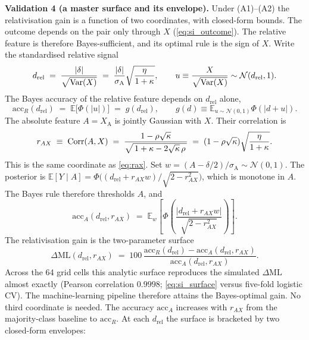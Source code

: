 \textbf{Validation 4 (a master surface and its envelope).} Under (A1)--(A2) the relativisation gain is a function of two coordinates, with closed-form bounds. The outcome depends on the pair only through $X$ (\cref{eq:si_outcome}). The relative feature is therefore Bayes-sufficient, and its optimal rule is the sign of $X$. Write the standardised relative signal
\begin{equation}
  d_{\mathrm{rel}} \;=\; \frac{|\delta|}{\sqrt{\operatorname{Var}(X)}} \;=\; \frac{|\delta|}{\sigma_{\mathrm{A}}}\sqrt{\frac{\eta}{1+\kappa}},
  \qquad u \equiv \frac{X}{\sqrt{\operatorname{Var}(X)}} \sim \mathcal{N}(d_{\mathrm{rel}},1).
  \label{eq:si_drel}
\end{equation}
The Bayes accuracy of the relative feature depends on $d_{\mathrm{rel}}$ alone,
\begin{equation}
  \mathrm{acc}_{R}(d_{\mathrm{rel}}) \;=\; \mathbb{E}\bigl[\Phi(|u|)\bigr] \;=\; g(d_{\mathrm{rel}}),
  \qquad g(d) \equiv \mathbb{E}_{u\sim\mathcal{N}(0,1)}\Phi(|d+u|).
  \label{eq:si_accR}
\end{equation}
The absolute feature $A=X_{\mathrm{A}}$ is jointly Gaussian with $X$. Their correlation is
\begin{equation}
  r_{AX} \;\equiv\; \operatorname{Corr}(A,X) \;=\; \frac{1-\rho\sqrt{\kappa}}{\sqrt{\,1+\kappa-2\sqrt{\kappa}\,\rho\,}} \;=\; (1-\rho\sqrt{\kappa})\sqrt{\frac{\eta}{1+\kappa}} .
  \label{eq:si_r}
\end{equation}
This is the same coordinate as \cref{eq:rax}. Set $w=(A-\delta/2)/\sigma_{\mathrm{A}}\sim\mathcal{N}(0,1)$. The posterior is $\mathbb{E}[Y\mid A]=\Phi\!\bigl((d_{\mathrm{rel}}+r_{AX}w)/\sqrt{2-r_{AX}^{2}}\bigr)$, which is monotone in $A$. The Bayes rule therefore thresholds $A$, and
\begin{equation}
  \mathrm{acc}_{A}(d_{\mathrm{rel}},r_{AX}) \;=\; \mathbb{E}_{w}\!\left[\Phi\!\left(\frac{|d_{\mathrm{rel}}+r_{AX}w|}{\sqrt{2-r_{AX}^{2}}}\right)\right].
  \label{eq:si_accA}
\end{equation}
The relativisation gain is the two-parameter surface
\begin{equation}
  \Delta\mathrm{ML}(d_{\mathrm{rel}},r_{AX}) \;=\; 100\,\frac{\mathrm{acc}_{R}(d_{\mathrm{rel}})-\mathrm{acc}_{A}(d_{\mathrm{rel}},r_{AX})}{\mathrm{acc}_{A}(d_{\mathrm{rel}},r_{AX})} .
  \label{eq:si_surface}
\end{equation}
Across the 64 grid cells this analytic surface reproduces the simulated $\Delta\mathrm{ML}$ almost exactly (Pearson correlation $0.9998$; \cref{eq:si_surface} versus five-fold logistic CV). The machine-learning pipeline therefore attains the Bayes-optimal gain. No third coordinate is needed. The accuracy $\mathrm{acc}_{A}$ increases with $r_{AX}$ from the majority-class baseline to $\mathrm{acc}_{R}$. At each $d_{\mathrm{rel}}$ the surface is bracketed by two closed-form envelopes:
